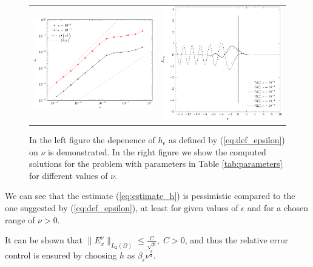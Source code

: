 \begin{figure}
\begin{tabular}{cc}
\includegraphics[height=0.32\textwidth]{pics_frequency_domain/h_nu.pdf}
&
\includegraphics[height=0.32\textwidth]{pics_frequency_domain/res_sol.pdf}
\end{tabular}
\caption{In the left figure the depenence of $h_{\epsilon}$ as defined by (\ref{eq:def_epsilon}) on $\nu$ is demonstrated. 
In the right figure we show the computed solutions for the problem with parameters in Table \ref{tab:parameters} for different values of $\nu$. }
\label{fig:dependence}
\end{figure}
We can see that the estimate (\ref{eq:estimate_h}) is pessimistic compared to the one suggested by (\ref{eq:def_epsilon}), 
at least for given values of $\epsilon$ and for a chosen range of $\nu>0$.
\begin{remark}
It can be shown that $\|E^{\nu}_{x}\|_{L_{2}(\Omega)}\leq \frac{C}{\sqrt{\nu}},\; C>0$, 
and thus the relative error control
\bealn
 \leq \epsilon
\eealn
 is ensured by choosing $h$ as $\beta_{\epsilon}\nu^{\frac{3}{4}}$.
\end{remark}

